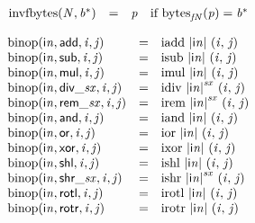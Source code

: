 $$
\begin{array}{@{}lcl@{}l@{}}
{\mathrm{invfbytes}}({\mathit{N}}, {{\mathit{b}}^\ast}) &=& {\mathit{p}} &\quad
  \mbox{if}~{{\mathrm{bytes}}}_{{{\mathit{f}}}{{\mathit{N}}}}({\mathit{p}}) = {{\mathit{b}}^\ast} \\
\end{array}
$$

\vspace{1ex}

$$
\begin{array}{@{}lcl@{}l@{}}
{\mathrm{binop}}({\mathsf{i}}{{\mathit{n}}}, \mathsf{add}, {\mathit{i}}, {\mathit{j}}) &=& {\mathrm{iadd}}~{|{\mathsf{i}}{{\mathit{n}}}|}~({\mathit{i}},\, {\mathit{j}}) &  \\
{\mathrm{binop}}({\mathsf{i}}{{\mathit{n}}}, \mathsf{sub}, {\mathit{i}}, {\mathit{j}}) &=& {\mathrm{isub}}~{|{\mathsf{i}}{{\mathit{n}}}|}~({\mathit{i}},\, {\mathit{j}}) &  \\
{\mathrm{binop}}({\mathsf{i}}{{\mathit{n}}}, \mathsf{mul}, {\mathit{i}}, {\mathit{j}}) &=& {\mathrm{imul}}~{|{\mathsf{i}}{{\mathit{n}}}|}~({\mathit{i}},\, {\mathit{j}}) &  \\
{\mathrm{binop}}({\mathsf{i}}{{\mathit{n}}}, {\mathsf{div\_}}{{\mathit{sx}}}, {\mathit{i}}, {\mathit{j}}) &=& {\mathrm{idiv}}~{{|{\mathsf{i}}{{\mathit{n}}}|}^{{\mathit{sx}}}}~({\mathit{i}},\, {\mathit{j}}) &  \\
{\mathrm{binop}}({\mathsf{i}}{{\mathit{n}}}, {\mathsf{rem\_}}{{\mathit{sx}}}, {\mathit{i}}, {\mathit{j}}) &=& {\mathrm{irem}}~{{|{\mathsf{i}}{{\mathit{n}}}|}^{{\mathit{sx}}}}~({\mathit{i}},\, {\mathit{j}}) &  \\
{\mathrm{binop}}({\mathsf{i}}{{\mathit{n}}}, \mathsf{and}, {\mathit{i}}, {\mathit{j}}) &=& {\mathrm{iand}}~{|{\mathsf{i}}{{\mathit{n}}}|}~({\mathit{i}},\, {\mathit{j}}) &  \\
{\mathrm{binop}}({\mathsf{i}}{{\mathit{n}}}, \mathsf{or}, {\mathit{i}}, {\mathit{j}}) &=& {\mathrm{ior}}~{|{\mathsf{i}}{{\mathit{n}}}|}~({\mathit{i}},\, {\mathit{j}}) &  \\
{\mathrm{binop}}({\mathsf{i}}{{\mathit{n}}}, \mathsf{xor}, {\mathit{i}}, {\mathit{j}}) &=& {\mathrm{ixor}}~{|{\mathsf{i}}{{\mathit{n}}}|}~({\mathit{i}},\, {\mathit{j}}) &  \\
{\mathrm{binop}}({\mathsf{i}}{{\mathit{n}}}, \mathsf{shl}, {\mathit{i}}, {\mathit{j}}) &=& {\mathrm{ishl}}~{|{\mathsf{i}}{{\mathit{n}}}|}~({\mathit{i}},\, {\mathit{j}}) &  \\
{\mathrm{binop}}({\mathsf{i}}{{\mathit{n}}}, {\mathsf{shr\_}}{{\mathit{sx}}}, {\mathit{i}}, {\mathit{j}}) &=& {\mathrm{ishr}}~{{|{\mathsf{i}}{{\mathit{n}}}|}^{{\mathit{sx}}}}~({\mathit{i}},\, {\mathit{j}}) &  \\
{\mathrm{binop}}({\mathsf{i}}{{\mathit{n}}}, \mathsf{rotl}, {\mathit{i}}, {\mathit{j}}) &=& {\mathrm{irotl}}~{|{\mathsf{i}}{{\mathit{n}}}|}~({\mathit{i}},\, {\mathit{j}}) &  \\
{\mathrm{binop}}({\mathsf{i}}{{\mathit{n}}}, \mathsf{rotr}, {\mathit{i}}, {\mathit{j}}) &=& {\mathrm{irotr}}~{|{\mathsf{i}}{{\mathit{n}}}|}~({\mathit{i}},\, {\mathit{j}}) &  \\
\end{array}
$$


